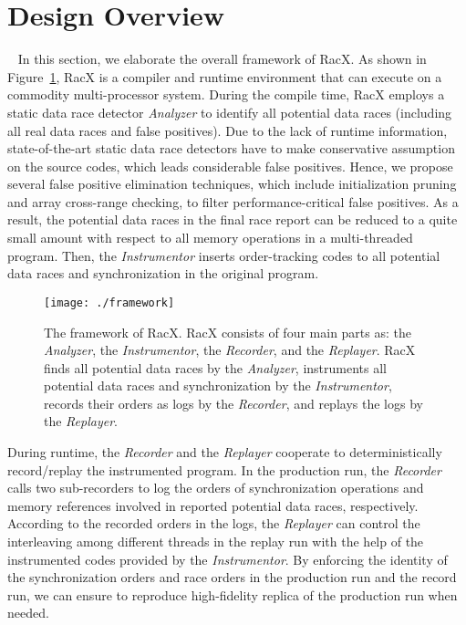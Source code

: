 \documentclass[10pt,onecolumn,letterpaper]{article}
\begin{document}
\section{Design Overview}~\label{sec:overview}
In this section, we elaborate the overall framework of RacX. As
shown in Figure~\ref{fig:framework}, RacX is a compiler and runtime
environment that can execute on a commodity multi-processor system.
During the compile time, RacX employs a static data race detector
\emph{Analyzer} to identify all potential data races (including all
real data races and false positives). Due to the lack of runtime
information, state-of-the-art static data race detectors have to
make conservative assumption on the source codes, which leads
considerable false positives. Hence, we propose several false
positive elimination techniques, which include initialization
pruning and array cross-range checking, to filter
performance-critical false positives. As a result, the potential
data races in the final race report can be reduced to a quite small
amount with respect to all memory operations in a multi-threaded
program. Then, the \emph{Instrumentor} inserts order-tracking codes
to all potential data races and synchronization in the original
program.

\begin{figure} [htbg]
\centering
\texttt{[image: ./framework]}
\caption{The framework of RacX. RacX consists of four main parts as:
the \emph{Analyzer}, the \emph{Instrumentor}, the \emph{Recorder},
and the \emph{Replayer}. RacX finds all potential data races by the
\emph{Analyzer}, instruments all potential data races and
synchronization by the \emph{Instrumentor}, records their orders as
logs by the \emph{Recorder}, and replays the logs by the
\emph{Replayer}.}\label{fig:framework}
\end{figure}

During runtime, the \emph{Recorder} and the \emph{Replayer}
cooperate to deterministically record/replay the instrumented
program. In the production run, the \emph{Recorder} calls two
sub-recorders to log the orders of synchronization operations and
memory references involved in reported potential data races,
respectively. According to the recorded orders in the logs, the
\emph{Replayer} can control the interleaving among different threads
in the replay run with the help of the instrumented codes provided
by the \emph{Instrumentor}. By enforcing the identity of the
synchronization orders and race orders in the production run and the
record run, we can ensure to reproduce high-fidelity replica of the
production run when needed.
\end{document}
